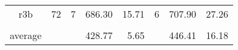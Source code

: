 \begin{landscape}
\begin{table}[]
\begin{tabular}{cl|lll|lll}
r3b                           & \multicolumn{1}{r|}{72}  & \multicolumn{1}{r}{7} & \multicolumn{1}{r}{686.30} & \multicolumn{1}{r|}{15.71}  & \multicolumn{1}{r}{6} & \multicolumn{1}{r}{707.90} & \multicolumn{1}{r}{27.26}  \\
       &           \multicolumn{1}{l|}{}               &                       &                       &                        &                       &                       &                        \\
\multicolumn{1}{l}{average} & \multicolumn{1}{l|}{}                        &                       & \multicolumn{1}{r}{428.77}                    & \multicolumn{1}{r|}{5.65}                  &                       & \multicolumn{1}{r}{446.41}                   & \multicolumn{1}{r}{16.18}                    \\ \hline
\end{tabular}
\end{table}
\end{landscape}




%
